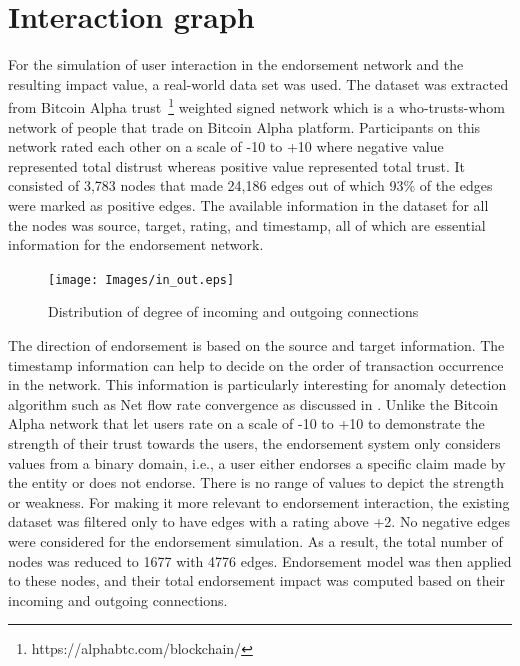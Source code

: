 \section{Interaction graph} \label{sec:interaction}
For the simulation of user interaction in the endorsement network and the
resulting impact value, a real-world data set was used. The dataset was
extracted from Bitcoin Alpha trust~\footnote{https://alphabtc.com/blockchain/}
weighted signed network which is a who-trusts-whom network of people that trade
on Bitcoin Alpha platform. Participants on this network rated each other on a
scale of -10 to +10 where negative value represented total distrust whereas
positive value represented total trust. It consisted of 3,783 nodes that made
24,186 edges out of which 93\% of the edges were marked as positive
edges\cite{kumar2016edge}.  The available information in the dataset for all
the nodes was source, target, rating, and timestamp, all of which are essential
information for the endorsement network. 
\begin{figure}
	\texttt{[image: Images/in\_out.eps]} 
	\caption{Distribution of degree of incoming and outgoing connections} 
	\label{inOut}
\end{figure}
The direction of endorsement is based on the source and target information.
The timestamp information can help to decide on the order of transaction
occurrence in the network. This information is particularly interesting for
anomaly detection algorithm such as Net flow rate convergence as discussed in
\cite{buechler2015decentralized}. Unlike the Bitcoin Alpha network that let
users rate on a scale of -10 to +10 to demonstrate the strength of their trust
towards the users, the endorsement system only considers values from a binary
domain, i.e., a user either endorses a specific claim made by the entity or
does not endorse. There is no range of values to depict the strength or
weakness. For making it more relevant to endorsement interaction, the existing
dataset was filtered only to have edges with a rating above +2. No negative
edges were considered for the endorsement simulation. As a result, the total
number of nodes was reduced to 1677 with 4776 edges. Endorsement model was then
applied to these nodes, and their total endorsement impact was computed based
on their incoming and outgoing connections. 


